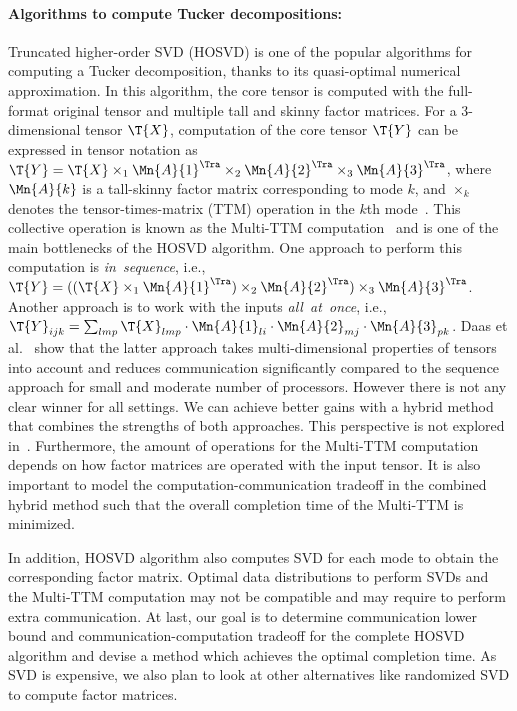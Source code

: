 \documentclass[a4paper,11pt]{article}
\newcommand{\X}{\T{X}}
\newcommand{\Y}{\T{Y}}
\newcommand{\bora}[1]{{\color{magenta} \emph{#1}}}
\begin{document}
	\vspace*{-0.25cm}\paragraph{Algorithms to compute Tucker decompositions:}
	Truncated higher-order SVD (HOSVD) is one of the popular algorithms for computing a Tucker decomposition, thanks to its quasi-optimal numerical approximation. In this algorithm, the core tensor is computed with the full-format original tensor and multiple tall and skinny factor matrices. For a 3-dimensional tensor $\X$, computation of the core tensor $\Y$ can be expressed in tensor notation as $\Y = \X \times_1 {\Mn{A}{1}}^\Tra \times_2 {\Mn{A}{2}}^\Tra \times_3 {\Mn{A}{3}}^\Tra$, where 
	$\Mn{A}{k}$ is a tall-skinny factor matrix corresponding to mode $k$, and $\times_k$ denotes the tensor-times-matrix (TTM) operation in the $k$th mode~\cite{KB-SIAM-2009}. This collective operation is known as the Multi-TTM computation~\cite{ABGKR-SIMAX-2022} and is one of the main bottlenecks of the HOSVD algorithm. One approach to perform this computation is \emph{in~sequence}, i.e., $\Y = ((\X \times_1 {\Mn{A}{1}}^\Tra )\times_2 {\Mn{A}{2}}^\Tra) \times_3 {\Mn{A}{3}}^\Tra$. Another approach is to work with the inputs \emph{all~at~once}, i.e., $\Y_{ijk} = \sum_{lmp}\X_{lmp}\cdot\Mn{A}{1}_{li}\cdot \Mn{A}{2}_{mj}\cdot \Mn{A}{3}_{pk}$.
	Daas et al.~\cite{ABGKR-SIMAX-2022} show that the latter approach takes multi-dimensional properties of tensors into account and reduces communication significantly compared to the sequence approach for small and moderate number of processors. However there is not any clear winner for all settings. We can achieve better gains with a hybrid method that combines the strengths of both approaches. This perspective is not explored in~\cite{ABGKR-SIMAX-2022}.
	Furthermore, the amount of operations for the Multi-TTM computation depends on how factor matrices are operated with the input tensor. It is also important to model the computation-communication tradeoff in the combined hybrid method such that the overall completion time of the Multi-TTM is minimized.
	
	In addition, HOSVD algorithm also computes SVD for each mode to obtain the corresponding factor matrix. Optimal data distributions to perform SVDs and the Multi-TTM computation may not be compatible and may require to perform extra communication. At last, our goal is to determine communication lower bound and communication-computation tradeoff for the complete HOSVD algorithm and devise a method which achieves the optimal completion time. As SVD is expensive, we also plan to look at other alternatives like randomized SVD to compute factor matrices.
	
\end{document}
